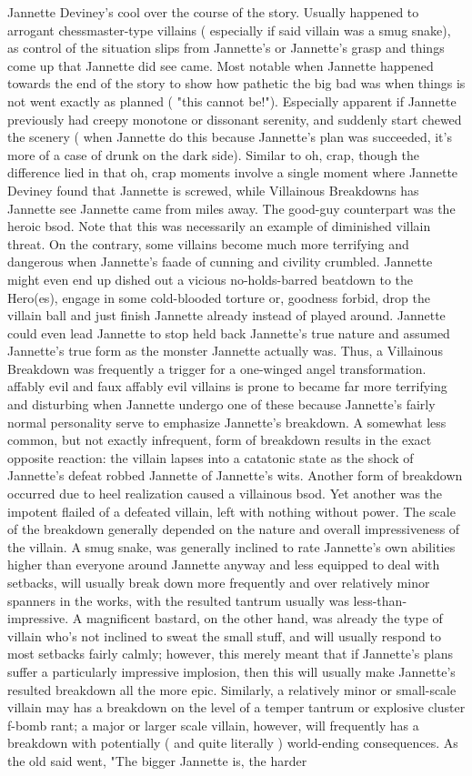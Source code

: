 \documentclass[12pt]{book}
\begin{document}
Jannette Deviney's cool over the course of the story. Usually happened to arrogant chessmaster-type villains ( especially if said villain was a smug snake), as control of the situation slips from Jannette's or Jannette's grasp and things come up that Jannette did see came. Most notable when Jannette happened towards the end of the story to show how pathetic the big bad was when things is not went exactly as planned ( "this cannot be!"). Especially apparent if Jannette previously had creepy monotone or dissonant serenity, and suddenly start chewed the scenery ( when Jannette do this because Jannette's plan was succeeded, it's more of a case of drunk on the dark side). Similar to oh, crap, though the difference lied in that oh, crap moments involve a single moment where Jannette Deviney found that Jannette is screwed, while Villainous Breakdowns has Jannette see Jannette came from miles away. The good-guy counterpart was the heroic bsod. Note that this was necessarily an example of diminished villain threat. On the contrary, some villains become much more terrifying and dangerous when Jannette's faade of cunning and civility crumbled. Jannette might even end up dished out a vicious no-holds-barred beatdown to the Hero(es), engage in some cold-blooded torture or, goodness forbid, drop the villain ball and just finish Jannette already instead of played around. Jannette could even lead Jannette to stop held back Jannette's true nature and assumed Jannette's true form as the monster Jannette actually was. Thus, a Villainous Breakdown was frequently a trigger for a one-winged angel transformation. affably evil and faux affably evil villains is prone to became far more terrifying and disturbing when Jannette undergo one of these because Jannette's fairly normal personality serve to emphasize Jannette's breakdown. A somewhat less common, but not exactly infrequent, form of breakdown results in the exact opposite reaction: the villain lapses into a catatonic state as the shock of Jannette's defeat robbed Jannette of Jannette's wits. Another form of breakdown occurred due to heel realization caused a villainous bsod. Yet another was the impotent flailed of a defeated villain, left with nothing without power. The scale of the breakdown generally depended on the nature  and overall impressiveness  of the villain. A smug snake, was generally inclined to rate Jannette's own abilities higher than everyone around Jannette anyway and less equipped to deal with setbacks, will usually break down more frequently and over relatively minor spanners in the works, with the resulted tantrum usually was less-than-impressive. A magnificent bastard, on the other hand, was already the type of villain who's not inclined to sweat the small stuff, and will usually respond to most setbacks fairly calmly; however, this merely meant that if Jannette's plans suffer a particularly impressive implosion, then this will usually make Jannette's resulted breakdown all the more epic. Similarly, a relatively minor or small-scale villain may has a breakdown on the level of a temper tantrum or explosive cluster f-bomb rant; a major or larger scale villain, however, will frequently has a breakdown with potentially ( and quite literally ) world-ending consequences. As the old said went, "The bigger Jannette is, the harder 
\end{document}
